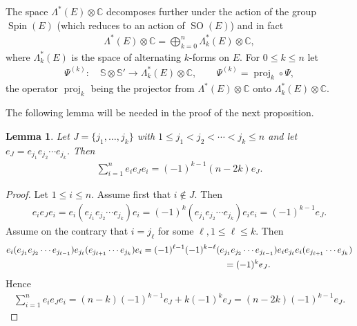 \documentclass[pdftex]{sigma}
\DeclareMathOperator{\Spin}{Spin}
\DeclareMathOperator{\proj}{proj}
\DeclareMathOperator{\SO}{SO}
\numberwithin{equation}{section}
\newtheorem{lem}[theor]{Lemma}
\begin{document}
The space $\Lambda^*(E)\otimes \mathbb C$ decomposes further under the action of the group $\Spin(E)$ (which reduces to an action of $\SO(E)$) and in fact
\begin{gather*}
\Lambda^*(E)\otimes \mathbb C= \bigoplus_{k=0}^n \Lambda^*_k(E)\otimes \mathbb C,
\end{gather*}
where $\Lambda^*_k(E)$ is the space of alternating $k$-forms on $E$.
For $0\leq k\leq n$ let
\begin{gather*}
\Psi^{(k)} \colon\quad \mathbb S\otimes \mathbb S' \to \Lambda^*_k(E)\otimes \mathbb C,\qquad
\Psi^{(k)}= \proj_k\circ \Psi,
\end{gather*}
the operator $\proj_k$ being the projector from $\Lambda^*(E) \otimes \mathbb C$ onto $\Lambda^*_k(E)\otimes \mathbb C$.

The following lemma will be needed in the proof of the next proposition.
\begin{lem}
Let $J=\{j_1,\ldots, j_k \}$ with $1\leq j_1<j_2<\cdots <j_k\leq n$ and let
$e_J = e_{j_1}e_{j_2} \cdots e_{j_k}$. Then
\begin{gather}\label{sumeiei}
 \sum_{i=1}^{n}e_i e_J e_i = (-1)^{k-1} (n-2k) e_J .
\end{gather}
\end{lem}

\begin{proof}
Let $1\leq i\leq n$. Assume first that $i\notin J$. Then
\begin{gather*}
e_ie_Je_i = e_i (e_{j_1} e_{j_2} \cdots e_{j_k}) e_i= (-1)^k (e_{j_1} e_{j_2} \cdots e_{j_k}) e_i e_i= (-1)^{k-1} e_J .
\end{gather*}
Assume on the contrary that $i=j_\ell$ for some $\ell, 1\leq \ell \leq k$. Then
\begin{gather*}
e_i (e_{j_1} e_{j_2} \cdots e_{j_{\ell-1}}) e_{j_\ell} (e_{j_{\ell+1}} \cdots e_{j_k} ) e_i
= (-1)^{\ell-1} (-1)^{k-\ell}(e_{j_1} e_{j_2} \cdots e_{j_{\ell-1}}) e_ie_{j_\ell} e_i(e_{j_{\ell+1}} \cdots e_{j_k} )
\\ \hphantom{e_i (e_{j_1} e_{j_2} \cdots e_{j_{\ell-1}}) e_{j_\ell} (e_{j_{\ell+1}} \cdots e_{j_k} ) e_i}
{}= (-1)^k e_J .
\end{gather*}
Hence
\begin{gather*}
\sum_{i=1}^{n} e_ie_Je_i = (n-k) (-1)^{k-1} e_J+ k(-1)^k e_J
= (n-2k)(-1)^{k-1} e_J . \tag*{\qed}
\end{gather*}
\renewcommand{\qed}{}
\end{proof}
\end{document}
